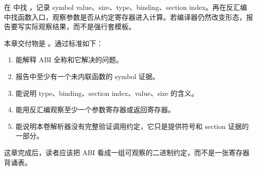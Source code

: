 在  中找 ，记录 symbol value、size、type、binding、section index。再在反汇编中找函数入口，观察参数是否从约定寄存器进入计算。若编译器仍然改变形态，报告要写实际观察结果，而不是强行套模板。


本章交付物是 。通过标准如下：

\begin{enumerate}
  \item 能解释 ABI 全称和它解决的问题。
  \item 报告中至少有一个未内联函数的 symbol 证据。
  \item 能说明 type、binding、section index、value、size 的含义。
  \item 能用反汇编观察至少一个参数寄存器或返回寄存器。
  \item 能说明本卷解析器没有完整验证调用约定，它只是提供符号和 section 证据的一部分。
\end{enumerate}

这章完成后，读者应该把 ABI 看成一组可观察的二进制约定，而不是一张寄存器背诵表。
